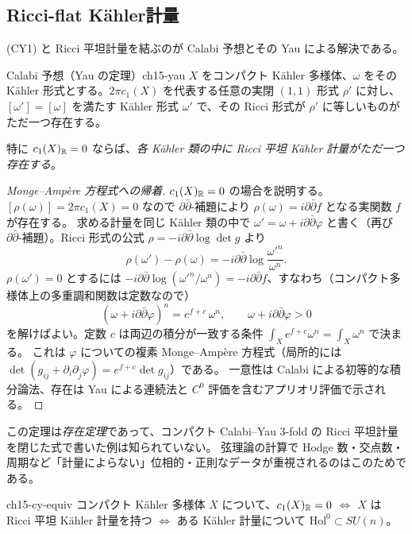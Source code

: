 \subsection{Ricci-flat K\"ahler計量}

(CY1) と Ricci 平坦計量を結ぶのが Calabi 予想とその Yau による解決である。

\begin{mythm}{Calabi 予想（Yau の定理）}{ch15-yau}
$X$ をコンパクト K\"ahler 多様体、$\omega$ をその K\"ahler 形式とする。$2\pi c_1(X)$ を代表する任意の実閉 $(1,1)$ 形式 $\rho'$ に対し、
$[\omega'] = [\omega]$ を満たす K\"ahler 形式 $\omega'$ で、その Ricci 形式が $\rho'$ に等しいものがただ一つ存在する。

特に $c_1(X)_{\mathbb{R}} = 0$ ならば、\emph{各 K\"ahler 類の中に Ricci 平坦 K\"ahler 計量がただ一つ存在する}。
\end{mythm}

\begin{proof}[Monge--Amp\`ere 方程式への帰着]
$c_1(X)_{\mathbb{R}}=0$ の場合を説明する。$[\rho(\omega)] = 2\pi c_1(X) = 0$ なので $\partial\bar\partial$-補題により $\rho(\omega) = i\partial\bar\partial f$ となる実関数 $f$ が存在する。
求める計量を同じ K\"ahler 類の中で $\omega' = \omega + i\partial\bar\partial\varphi$ と書く（再び $\partial\bar\partial$-補題）。Ricci 形式の公式 $\rho = -i\partial\bar\partial\log\det g$ より
\[
\rho(\omega') - \rho(\omega) = -i\partial\bar\partial\log\frac{\omega'^n}{\omega^n}.
\]
$\rho(\omega') = 0$ とするには $-i\partial\bar\partial\log(\omega'^n/\omega^n) = -i\partial\bar\partial f$、すなわち（コンパクト多様体上の多重調和関数は定数なので）
\[
(\omega + i\partial\bar\partial\varphi)^n = e^{f+c}\,\omega^n,\qquad \omega+i\partial\bar\partial\varphi>0
\]
を解けばよい。定数 $c$ は両辺の積分が一致する条件 $\int_X e^{f+c}\omega^n = \int_X\omega^n$ で決まる。
これは $\varphi$ についての複素 Monge--Amp\`ere 方程式（局所的には $\det(g_{i\bar j}+\partial_i\partial_{\bar j}\varphi) = e^{f+c}\det g_{i\bar j}$）である。
一意性は Calabi による初等的な積分論法、存在は Yau による連続法と $C^0$ 評価を含むアプリオリ評価で示される。
\end{proof}

この定理は\emph{存在定理}であって、コンパクト Calabi--Yau 3-fold の Ricci 平坦計量を閉じた式で書いた例は知られていない。
弦理論の計算で Hodge 数・交点数・周期など「計量によらない」位相的・正則なデータが重視されるのはこのためである。

\begin{mycor}{}{ch15-cy-equiv}
コンパクト K\"ahler 多様体 $X$ について、$c_1(X)_{\mathbb{R}} = 0$ $\Longleftrightarrow$ $X$ は Ricci 平坦 K\"ahler 計量を持つ $\Longleftrightarrow$ ある K\"ahler 計量について $\mathrm{Hol}^0\subset SU(n)$。
\end{mycor}


